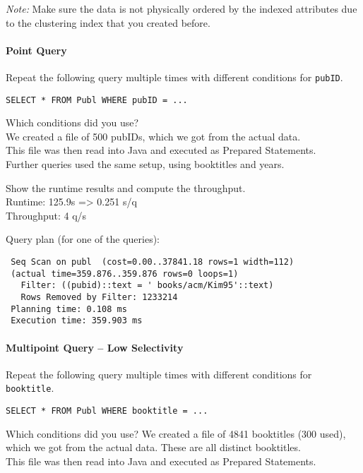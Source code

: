 \documentclass[11pt]{scrartcl}
\begin{document}
\noindent \emph{Note:} Make sure the data is not physically ordered by
the indexed attributes due to the clustering index that you created
before.

\paragraph{Point Query}

Repeat the following query multiple times with different conditions for {\tt pubID}.

{\small
\begin{verbatim}
SELECT * FROM Publ WHERE pubID = ...
\end{verbatim}
}

\noindent
Which conditions did you use?\\
We created a file of 500 pubIDs, which we got from the actual data.\\
This file was then read into Java and executed as Prepared Statements.\\
Further queries used the same setup, using booktitles and years.

\smallskip\noindent
Show the runtime results and compute the throughput.\\
Runtime: 125.9s => 0.251 s/q\\
Throughput: 4 q/s

\smallskip\noindent
Query plan (for one of the queries):
{\small
\begin{verbatim}
 Seq Scan on publ  (cost=0.00..37841.18 rows=1 width=112)
 (actual time=359.876..359.876 rows=0 loops=1)
   Filter: ((pubid)::text = ' books/acm/Kim95'::text)
   Rows Removed by Filter: 1233214
 Planning time: 0.108 ms
 Execution time: 359.903 ms
\end{verbatim}
}


\paragraph{Multipoint Query -- Low Selectivity}

Repeat the following query multiple times with different conditions for {\tt booktitle}.

{\small
\begin{verbatim}
SELECT * FROM Publ WHERE booktitle = ...
\end{verbatim}
}

\noindent
Which conditions did you use?
We created a file of 4841 booktitles (300 used), which we got from the actual data. These are all distinct booktitles.\\
This file was then read into Java and executed as Prepared Statements.
\end{document}
